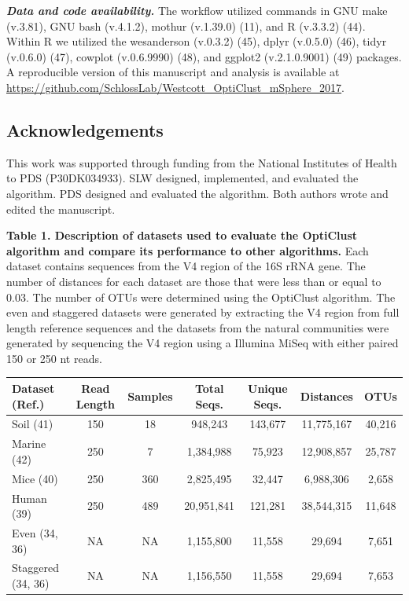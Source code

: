 \documentclass[11pt,]{article}
\begin{document}
\textbf{\emph{Data and code availability.}} The workflow utilized
commands in GNU make (v.3.81), GNU bash (v.4.1.2), mothur (v.1.39.0)
(11), and R (v.3.3.2) (44). Within R we utilized the wesanderson
(v.0.3.2) (45), dplyr (v.0.5.0) (46), tidyr (v.0.6.0) (47), cowplot
(v.0.6.9990) (48), and ggplot2 (v.2.1.0.9001) (49) packages. A
reproducible version of this manuscript and analysis is available at
\url{https://github.com/SchlossLab/Westcott_OptiClust_mSphere_2017}.

\subsection{Acknowledgements}\label{acknowledgements}

This work was supported through funding from the National Institutes of
Health to PDS (P30DK034933). SLW designed, implemented, and evaluated
the algorithm. PDS designed and evaluated the algorithm. Both authors
wrote and edited the manuscript.

\newpage

\textbf{Table 1. Description of datasets used to evaluate the OptiClust
algorithm and compare its performance to other algorithms.} Each dataset
contains sequences from the V4 region of the 16S rRNA gene. The number
of distances for each dataset are those that were less than or equal to
0.03. The number of OTUs were determined using the OptiClust algorithm.
The even and staggered datasets were generated by extracting the V4
region from full length reference sequences and the datasets from the
natural communities were generated by sequencing the V4 region using a
Illumina MiSeq with either paired 150 or 250 nt reads.

\begin{longtable}[c]{@{}lcccccc@{}}
\toprule
\textbf{Dataset (Ref.)} & \textbf{Read Length} & \textbf{Samples} &
\textbf{Total Seqs.} & \textbf{Unique Seqs.} & \textbf{Distances} &
\textbf{OTUs}\tabularnewline
\midrule
\endhead
Soil (41) & 150 & 18 & 948,243 & 143,677 & 11,775,167 &
40,216\tabularnewline
Marine (42) & 250 & 7 & 1,384,988 & 75,923 & 12,908,857 &
25,787\tabularnewline
Mice (40) & 250 & 360 & 2,825,495 & 32,447 & 6,988,306 &
2,658\tabularnewline
Human (39) & 250 & 489 & 20,951,841 & 121,281 & 38,544,315 &
11,648\tabularnewline
Even (34, 36) & NA & NA & 1,155,800 & 11,558 & 29,694 &
7,651\tabularnewline
Staggered (34, 36) & NA & NA & 1,156,550 & 11,558 & 29,694 &
7,653\tabularnewline
\bottomrule
\end{longtable}
\end{document}
